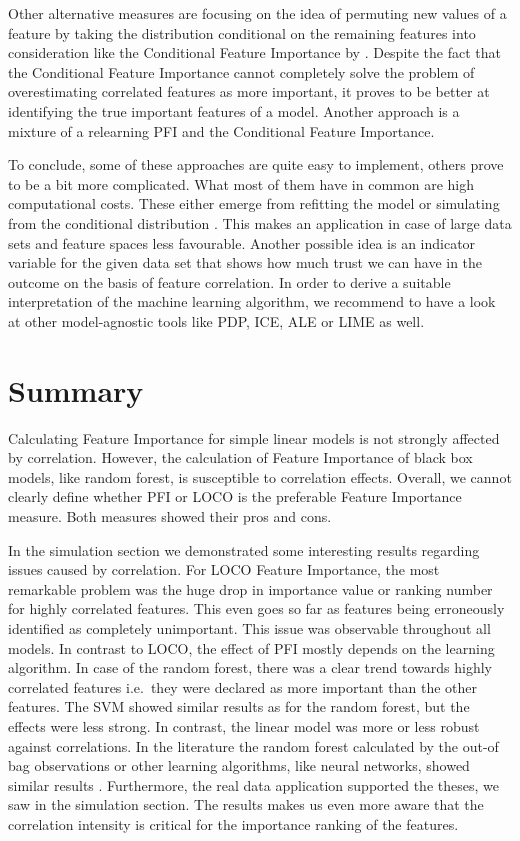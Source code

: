 \documentclass[]{krantz}
\begin{document}
Other alternative measures are focusing on the idea of permuting new
values of a feature by taking the distribution conditional on the
remaining features into consideration like the Conditional Feature
Importance by \citet{strobl2008}. Despite the fact that the Conditional
Feature Importance cannot completely solve the problem of overestimating
correlated features as more important, it proves to be better at
identifying the true important features of a model. Another approach is
a mixture of a relearning PFI \citep{mentch2016} and the Conditional
Feature Importance. \citep{hooker2019}

To conclude, some of these approaches are quite easy to implement,
others prove to be a bit more complicated. What most of them have in
common are high computational costs. These either emerge from refitting
the model or simulating from the conditional distribution
\citep{hooker2019}. This makes an application in case of large data sets
and feature spaces less favourable. Another possible idea is an
indicator variable for the given data set that shows how much trust we
can have in the outcome on the basis of feature correlation. In order to
derive a suitable interpretation of the machine learning algorithm, we
recommend to have a look at other model-agnostic tools like PDP, ICE,
ALE or LIME as well.

\section{Summary}\label{summary-1}

Calculating Feature Importance for simple linear models is not strongly
affected by correlation. However, the calculation of Feature Importance
of black box models, like random forest, is susceptible to correlation
effects. Overall, we cannot clearly define whether PFI or LOCO is the
preferable Feature Importance measure. Both measures showed their pros
and cons.

In the simulation section we demonstrated some interesting results
regarding issues caused by correlation. For LOCO Feature Importance, the
most remarkable problem was the huge drop in importance value or ranking
number for highly correlated features. This even goes so far as features
being erroneously identified as completely unimportant. This issue was
observable throughout all models. In contrast to LOCO, the effect of PFI
mostly depends on the learning algorithm. In case of the random forest,
there was a clear trend towards highly correlated features i.e.~they
were declared as more important than the other features. The SVM showed
similar results as for the random forest, but the effects were less
strong. In contrast, the linear model was more or less robust against
correlations. In the literature the random forest calculated by the
out-of bag observations or other learning algorithms, like neural
networks, showed similar results \citep{hooker2019}. Furthermore, the
real data application supported the theses, we saw in the simulation
section. The results makes us even more aware that the correlation
intensity is critical for the importance ranking of the features.
\end{document}
